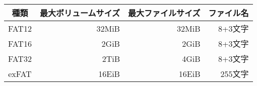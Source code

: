 \documentclass{standalone}
\begin{document}
\begin{tabular}{c | r | r |r }\hline\hline
  \multicolumn{1}{c|}{種類} &
  \multicolumn{1}{c|}{最大ボリュームサイズ} &
  \multicolumn{1}{c|}{最大ファイルサイズ} &
  \multicolumn{1}{c}{ファイル名} \\\hline
  FAT12 & 32MiB & 32MiB & 8+3文字 \\
  FAT16 & 2GiB  & 2GiB & 8+3文字 \\
  FAT32 & 2TiB  & 4GiB & 8+3文字 \\
  exFAT & 16EiB & 16EiB & 255文字 \\
\end{tabular}
\end{document}
